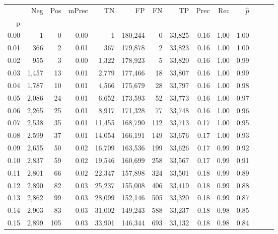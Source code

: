\begin{tabular}{rrrrrrrrrrrrrr}
\toprule
{} &    Neg &  Pos & mPrec &       TN &       FP &      FN &      TP &  Prec &   Rec & $\hat{p}$ \\
p    &        &      &       &          &          &         &         &       &       &           \\
\midrule
0.00 &      1 &    0 &  0.00 &        1 &  180,244 &       0 &  33,825 &  0.16 &  1.00 &      1.00 \\
0.01 &    366 &    2 &  0.01 &      367 &  179,878 &       2 &  33,823 &  0.16 &  1.00 &      1.00 \\
0.02 &    955 &    3 &  0.00 &    1,322 &  178,923 &       5 &  33,820 &  0.16 &  1.00 &      0.99 \\
0.03 &  1,457 &   13 &  0.01 &    2,779 &  177,466 &      18 &  33,807 &  0.16 &  1.00 &      0.99 \\
0.04 &  1,787 &   10 &  0.01 &    4,566 &  175,679 &      28 &  33,797 &  0.16 &  1.00 &      0.98 \\
0.05 &  2,086 &   24 &  0.01 &    6,652 &  173,593 &      52 &  33,773 &  0.16 &  1.00 &      0.97 \\
0.06 &  2,265 &   25 &  0.01 &    8,917 &  171,328 &      77 &  33,748 &  0.16 &  1.00 &      0.96 \\
0.07 &  2,538 &   35 &  0.01 &   11,455 &  168,790 &     112 &  33,713 &  0.17 &  1.00 &      0.95 \\
0.08 &  2,599 &   37 &  0.01 &   14,054 &  166,191 &     149 &  33,676 &  0.17 &  1.00 &      0.93 \\
0.09 &  2,655 &   50 &  0.02 &   16,709 &  163,536 &     199 &  33,626 &  0.17 &  0.99 &      0.92 \\
0.10 &  2,837 &   59 &  0.02 &   19,546 &  160,699 &     258 &  33,567 &  0.17 &  0.99 &      0.91 \\
0.11 &  2,801 &   66 &  0.02 &   22,347 &  157,898 &     324 &  33,501 &  0.18 &  0.99 &      0.89 \\
0.12 &  2,890 &   82 &  0.03 &   25,237 &  155,008 &     406 &  33,419 &  0.18 &  0.99 &      0.88 \\
0.13 &  2,862 &   99 &  0.03 &   28,099 &  152,146 &     505 &  33,320 &  0.18 &  0.99 &      0.87 \\
0.14 &  2,903 &   83 &  0.03 &   31,002 &  149,243 &     588 &  33,237 &  0.18 &  0.98 &      0.85 \\
0.15 &  2,899 &  105 &  0.03 &   33,901 &  146,344 &     693 &  33,132 &  0.18 &  0.98 &      0.84 \\

\end{tabular}
